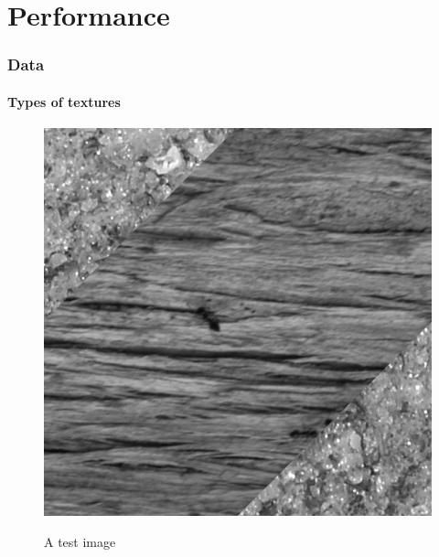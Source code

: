 \documentclass[12pt]{beamer}
\begin{document}
\section{Performance}
\begin{frame}
  \frametitle{Data}
  \framesubtitle{Types of textures}
  
  \begin{figure}[H]
  \centering
  \includegraphics[scale=0.3]{../data/mytest/test1}
  \label{fig:test1}
  \caption{A test image}
  \end{figure} 
  
\end{frame}
\end{document}
